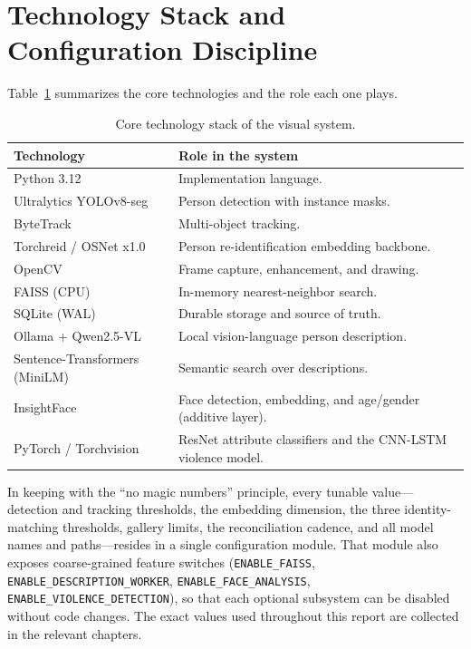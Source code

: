 \documentclass[12pt]{report}
\begin{document}
\section{Technology Stack and Configuration Discipline}
Table~\ref{tab:stack} summarizes the core technologies and the role each one plays.

\begin{table}[H]
\centering
\begin{tabularx}{\textwidth}{|l|X|}
\hline
\textbf{Technology} & \textbf{Role in the system} \\
\hline
Python 3.12 & Implementation language. \\
\hline
Ultralytics YOLOv8-seg & Person detection with instance masks. \\
\hline
ByteTrack & Multi-object tracking. \\
\hline
Torchreid / OSNet x1.0 & Person re-identification embedding backbone. \\
\hline
OpenCV & Frame capture, enhancement, and drawing. \\
\hline
FAISS (CPU) & In-memory nearest-neighbor search. \\
\hline
SQLite (WAL) & Durable storage and source of truth. \\
\hline
Ollama + Qwen2.5-VL & Local vision-language person description. \\
\hline
Sentence-Transformers (MiniLM) & Semantic search over descriptions. \\
\hline
InsightFace & Face detection, embedding, and age/gender (additive layer). \\
\hline
PyTorch / Torchvision & ResNet attribute classifiers and the CNN-LSTM violence model. \\
\hline
\end{tabularx}
\caption{Core technology stack of the visual system.}
\label{tab:stack}
\end{table}

In keeping with the ``no magic numbers'' principle, every tunable value---detection and tracking thresholds, the embedding dimension, the three identity-matching thresholds, gallery limits, the reconciliation cadence, and all model names and paths---resides in a single configuration module. That module also exposes coarse-grained feature switches (\texttt{ENABLE\_FAISS}, \texttt{ENABLE\_DESCRIPTION\_WORKER}, \texttt{ENABLE\_FACE\_ANALYSIS}, \texttt{ENABLE\_VIOLENCE\_DETECTION}), so that each optional subsystem can be disabled without code changes. The exact values used throughout this report are collected in the relevant chapters.
\end{document}
